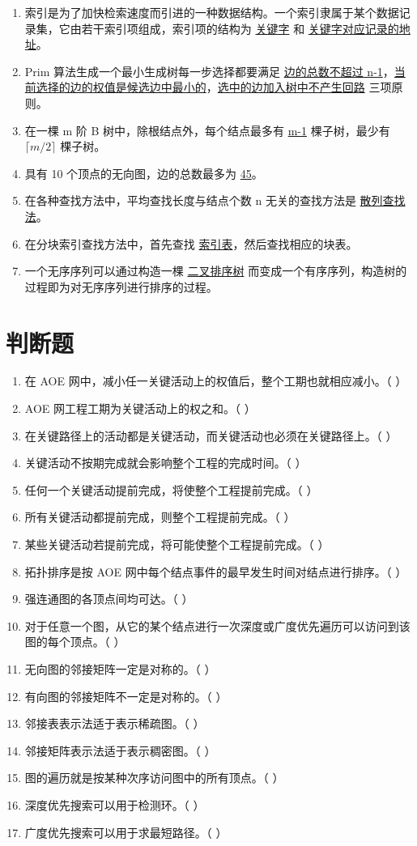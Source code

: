 \documentclass[12pt, a4paper]{article}
\begin{document}
\begin{enumerate}
	\item 索引是为了加快检索速度而引进的一种数据结构。一个索引隶属于某个数据记录集，它由若干索引项组成，索引项的结构为 \underline{关键字} 和 \underline{关键字对应记录的地址}。
	\item Prim 算法生成一个最小生成树每一步选择都要满足 \underline{边的总数不超过 n-1}，\underline{当前选择的边的权值是候选边中最小的}，\underline{选中的边加入树中不产生回路} 三项原则。
	\item 在一棵 m 阶 B 树中，除根结点外，每个结点最多有 \underline{m-1} 棵子树，最少有 \underline{$\lceil m/2 \rceil$} 棵子树。
	\item 具有 10 个顶点的无向图，边的总数最多为 \underline{45}。
	\item 在各种查找方法中，平均查找长度与结点个数 n 无关的查找方法是 \underline{散列查找法}。
	\item 在分块索引查找方法中，首先查找 \underline{索引表}，然后查找相应的块表。
	\item 一个无序序列可以通过构造一棵 \underline{二叉排序树} 而变成一个有序序列，构造树的过程即为对无序序列进行排序的过程。
\end{enumerate}

\section*{判断题}

\begin{enumerate}
	\item 在 AOE 网中，减小任一关键活动上的权值后，整个工期也就相应减小。（ ）
	\item AOE 网工程工期为关键活动上的权之和。（ ）
	\item 在关键路径上的活动都是关键活动，而关键活动也必须在关键路径上。（ ）
	\item 关键活动不按期完成就会影响整个工程的完成时间。（ ）
	\item 任何一个关键活动提前完成，将使整个工程提前完成。（ ）
	\item 所有关键活动都提前完成，则整个工程提前完成。（ ）
	\item 某些关键活动若提前完成，将可能使整个工程提前完成。（ ）
	\item 拓扑排序是按 AOE 网中每个结点事件的最早发生时间对结点进行排序。（ ）
	\item 强连通图的各顶点间均可达。（ ）
	\item 对于任意一个图，从它的某个结点进行一次深度或广度优先遍历可以访问到该图的每个顶点。（ ）
	\item 无向图的邻接矩阵一定是对称的。（ ）
	\item 有向图的邻接矩阵不一定是对称的。（ ）
	\item 邻接表表示法适于表示稀疏图。（ ）
	\item 邻接矩阵表示法适于表示稠密图。（ ）
	\item 图的遍历就是按某种次序访问图中的所有顶点。（ ）
	\item 深度优先搜索可以用于检测环。（ ）
	\item 广度优先搜索可以用于求最短路径。（ ）
\end{enumerate}
\end{document}
